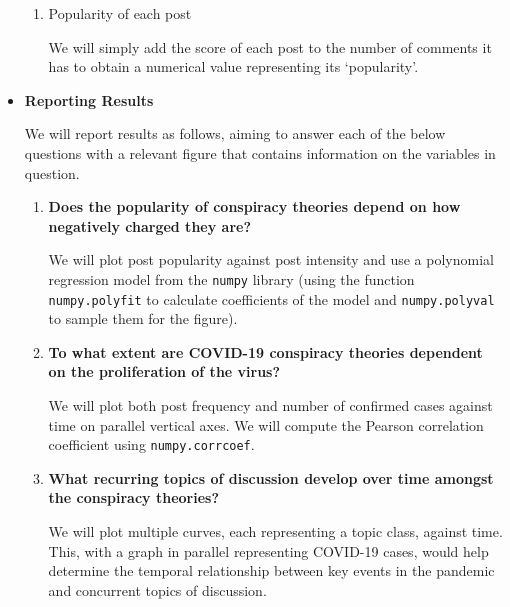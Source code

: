 \documentclass[fontsize=11pt]{article}
\begin{document}
\begin{itemize}
\begin{enumerate}
          \item Popularity of each post

                We will simply add the score of each post to the number of comments it has to obtain a numerical value representing its `popularity'.
      \end{enumerate}

\item \textbf{Reporting Results}

      We will report results as follows, aiming to answer each of the below questions with a relevant figure that contains information on the variables in question.

      \begin{enumerate}
          \item \textbf{Does the popularity of conspiracy theories depend on how negatively charged they are?}

                We will plot post popularity against post intensity and use a polynomial regression model from the \texttt{numpy} library (using the function \texttt{numpy.polyfit} to calculate coefficients of the model and \texttt{numpy.polyval} to sample them for the figure).
          \item \textbf{To what extent are COVID-19 conspiracy theories dependent on the proliferation of the virus?}

                We will plot both post frequency and number of confirmed cases against time on parallel vertical axes. We will compute the Pearson correlation coefficient using \texttt{numpy.corrcoef}.
          \item \textbf{What recurring topics of discussion develop over time amongst the conspiracy theories?}

                We will plot multiple curves, each representing a topic class, against time. This, with a graph in parallel representing COVID-19 cases, would help determine the temporal relationship between key events in the pandemic and concurrent topics of discussion.
      \end{enumerate}


\end{itemize}

\printbibliography
\end{document}
